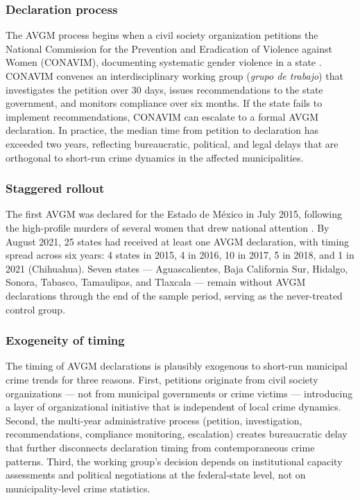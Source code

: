 \documentclass[12pt]{article}
\begin{document}
\subsubsection*{Declaration process} The AVGM process begins when a civil society organization petitions the National Commission for the Prevention and Eradication of Violence against Women (CONAVIM), documenting systematic gender violence in a state \citep{conavim2015}. CONAVIM convenes an interdisciplinary working group (\textit{grupo de trabajo}) that investigates the petition over 30 days, issues recommendations to the state government, and monitors compliance over six months. If the state fails to implement recommendations, CONAVIM can escalate to a formal AVGM declaration. In practice, the median time from petition to declaration has exceeded two years, reflecting bureaucratic, political, and legal delays that are orthogonal to short-run crime dynamics in the affected municipalities.

\subsubsection*{Staggered rollout} The first AVGM was declared for the Estado de M\'exico in July 2015, following the high-profile murders of several women that drew national attention \citep{inchaustegui_lopez2012}. By August 2021, 25 states had received at least one AVGM declaration, with timing spread across six years: 4 states in 2015, 4 in 2016, 10 in 2017, 5 in 2018, and 1 in 2021 (Chihuahua). Seven states --- Aguascalientes, Baja California Sur, Hidalgo, Sonora, Tabasco, Tamaulipas, and Tlaxcala --- remain without AVGM declarations through the end of the sample period, serving as the never-treated control group.

\subsubsection*{Exogeneity of timing} The timing of AVGM declarations is plausibly exogenous to short-run municipal crime trends for three reasons. First, petitions originate from civil society organizations --- not from municipal governments or crime victims --- introducing a layer of organizational initiative that is independent of local crime dynamics. Second, the multi-year administrative process (petition, investigation, recommendations, compliance monitoring, escalation) creates bureaucratic delay that further disconnects declaration timing from contemporaneous crime patterns. Third, the working group's decision depends on institutional capacity assessments and political negotiations at the federal-state level, not on municipality-level crime statistics.
\end{document}
